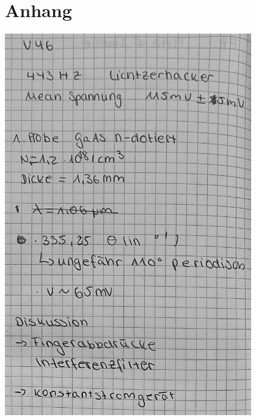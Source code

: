 \section*{Anhang}


\centering

\vfill
\includegraphics[width=0.8\textwidth]{content/messung/1.jpg}
\vfill
\newpage

